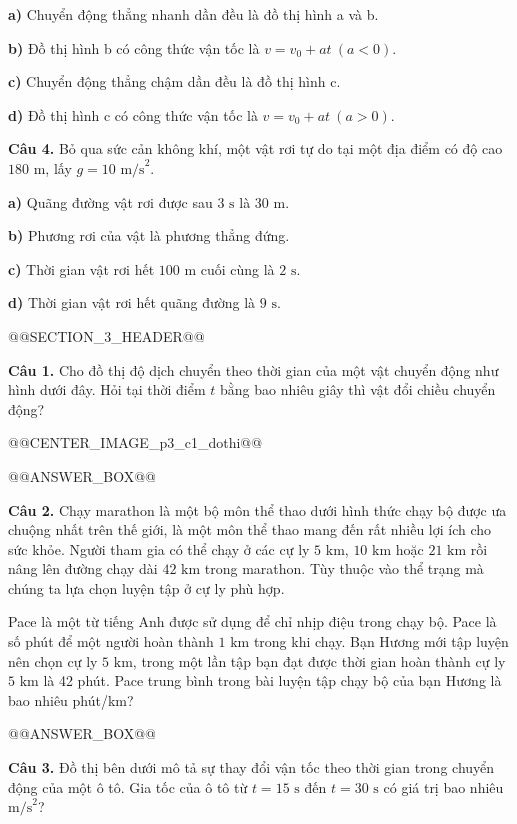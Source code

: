 \documentclass[11pt,a4paper]{article}
\begin{document}
\textbf{a)} Chuyển động thẳng nhanh dần đều là đồ thị hình a và b.

\textbf{b)} Đồ thị hình b có công thức vận tốc là $v = v_0 + at\ (a < 0)$.

\textbf{c)} Chuyển động thẳng chậm dần đều là đồ thị hình c.

\textbf{d)} Đồ thị hình c có công thức vận tốc là $v = v_0 + at\ (a > 0)$.

\textbf{Câu 4.} Bỏ qua sức cản không khí, một vật rơi tự do tại một địa điểm có độ cao $180\text{ m}$, lấy $g = 10\text{ m/s}^2$.

\textbf{a)} Quãng đường vật rơi được sau $3\text{ s}$ là $30\text{ m}$.

\textbf{b)} Phương rơi của vật là phương thẳng đứng.

\textbf{c)} Thời gian vật rơi hết $100\text{ m}$ cuối cùng là $2\text{ s}$.

\textbf{d)} Thời gian vật rơi hết quãng đường là $9\text{ s}$.

@@SECTION_3_HEADER@@

\textbf{Câu 1.} Cho đồ thị độ dịch chuyển theo thời gian của một vật chuyển động như hình dưới đây. Hỏi tại thời điểm $t$ bằng bao nhiêu giây thì vật đổi chiều chuyển động?

@@CENTER_IMAGE_p3_c1_dothi@@

@@ANSWER_BOX@@

\textbf{Câu 2.} Chạy marathon là một bộ môn thể thao dưới hình thức chạy bộ được ưa chuộng nhất trên thế giới, là một môn thể thao mang đến rất nhiều lợi ích cho sức khỏe. Người tham gia có thể chạy ở các cự ly $5\text{ km}$, $10\text{ km}$ hoặc $21\text{ km}$ rồi nâng lên đường chạy dài $42\text{ km}$ trong marathon. Tùy thuộc vào thể trạng mà chúng ta lựa chọn luyện tập ở cự ly phù hợp.

Pace là một từ tiếng Anh được sử dụng để chỉ nhịp điệu trong chạy bộ. Pace là số phút để một người hoàn thành $1\text{ km}$ trong khi chạy. Bạn Hương mới tập luyện nên chọn cự ly $5\text{ km}$, trong một lần tập bạn đạt được thời gian hoàn thành cự ly $5\text{ km}$ là 42 phút. Pace trung bình trong bài luyện tập chạy bộ của bạn Hương là bao nhiêu phút/km?

@@ANSWER_BOX@@

\textbf{Câu 3.} Đồ thị bên dưới mô tả sự thay đổi vận tốc theo thời gian trong chuyển động của một ô tô. Gia tốc của ô tô từ $t = 15\text{ s}$ đến $t = 30\text{ s}$ có giá trị bao nhiêu $\text{m/s}^2$?
\end{document}
